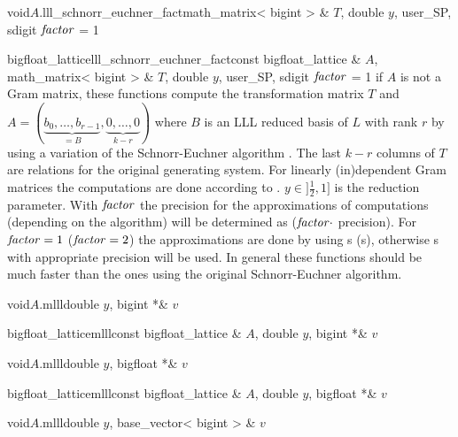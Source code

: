 \begin{fcode}{void}{$A$.lll_schnorr_euchner_fact}{math_matrix< bigint > & $T$, double $y$,
    user_SP, sdigit $\mathit{factor}$ = 1}%
\end{fcode}

\begin{fcode}{bigfloat_lattice}{lll_schnorr_euchner_fact}{const bigfloat_lattice & $A$,
    math_matrix< bigint > & $T$, double $y$, user_SP, sdigit $\mathit{factor}$ = 1}%
  if $A$ is not a Gram matrix, these functions compute the transformation matrix $T$ and $A =
  (\underbrace{b_0, \dots, b_{r-1}}_{=B},\underbrace{0, \dots, 0}_{k-r})$ where $B$ is an LLL
  reduced basis of $L$ with rank $r$ by using a variation of the Schnorr-Euchner algorithm
  \cite{Wetzel/Backes:2000}.  The last $k-r$ columns of $T$ are relations for the original
  generating system.  For linearly (in)dependent Gram matrices the computations are done
  according to \cite{Cohen:1995}.  $y\in ]\frac{1}{2},1]$ is the reduction parameter.  With
  $\mathit{factor}$ the precision for the approximations of computations (depending on the algorithm)
  will be determined as ($\mathit{factor} \cdot$  precision).  For $\mathit{factor} = 1$ ($\mathit{factor}
  = 2$) the approximations are done by using s (s), otherwise
  s with appropriate precision will be used.  In general these functions should
  be much faster than the ones using the original Schnorr-Euchner algorithm.
\end{fcode}



\begin{fcode}{void}{$A$.mlll}{double $y$, bigint *& $v$}
\end{fcode}

\begin{fcode}{bigfloat_lattice}{mlll}{const bigfloat_lattice & $A$, double $y$, bigint *& $v$}
\end{fcode}

\begin{fcode}{void}{$A$.mlll}{double $y$, bigfloat *& $v$}
\end{fcode}

\begin{fcode}{bigfloat_lattice}{mlll}{const bigfloat_lattice & $A$, double $y$, bigfloat *& $v$}
\end{fcode}

\begin{fcode}{void}{$A$.mlll}{double $y$, base_vector< bigint > & $v$}
\end{fcode}

